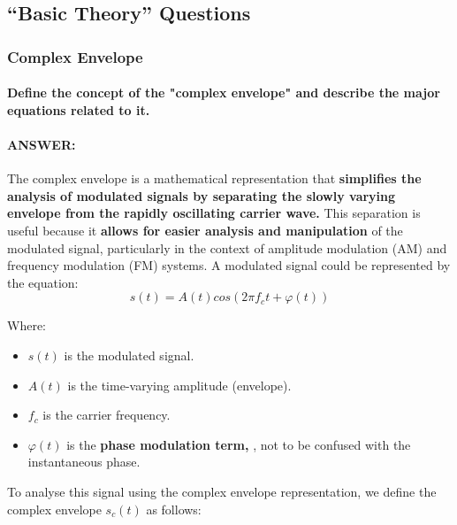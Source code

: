 \documentclass[colorlinks,11pt,a4paper,normalphoto,withhyper,ragged2e]{altareport}
\begin{document}
		\subsection{``Basic Theory'' Questions}
			
			
			
			
			
			
			
			\subsubsection{Complex Envelope}
				
				\paragraph{Define the concept of the "complex envelope" and describe the major equations related to it.}
				
				\paragraph{ANSWER:}
				
				The complex envelope is a mathematical representation that \textbf{simplifies the analysis of modulated signals by separating the slowly varying envelope from the rapidly oscillating carrier wave.} This separation is useful because it \textbf{allows for easier analysis and manipulation} of the modulated signal, particularly in the context of amplitude modulation (AM) and frequency modulation (FM) systems. \linebreak
				A modulated signal could be represented by the equation:
				\begin{equation}
					s(t) = A(t) cos( 2 \pi f_c t + \varphi(t))
				\end{equation}
				
				Where:
				\begin{itemize}[leftmargin=1cm]
					\item $s(t)$ is the modulated signal.
					\item $A(t)$ is the time-varying amplitude (envelope).
					\item $f_c$ is the carrier frequency.
					\item $\varphi(t)$ is the\textbf{ phase modulation term, }, not to be confused with the instantaneous phase.
				\end{itemize}
				
				To analyse this signal using the complex envelope representation, we define the complex envelope $s_c(t)$ as follows:
				
\end{document}
